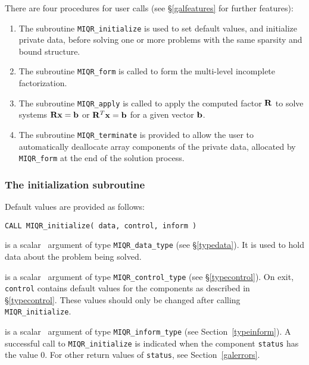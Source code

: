 \documentclass{galahad}
\newcommand{\packagename}{MIQR}
\begin{document}

\galarguments
There are four procedures for user calls
(see \S\ref{galfeatures} for further features):

\begin{enumerate}
\item The subroutine
      {\tt \packagename\_initialize}
      is used to set default values, and initialize private data,
      before solving one or more problems with the
      same sparsity and bound structure.
\item The subroutine
      {\tt \packagename\_form}
      is called to form the  multi-level incomplete factorization.
\item The subroutine
      {\tt \packagename\_apply}
      is called to apply the computed factor ${\mathbf{R}}$ to solve systems
      ${\mathbf{R}} {\mathbf{x}} = {\mathbf{b}}$ or ${\mathbf{R}}^T {\mathbf{x}} = {\mathbf{b}}$
      for a given vector ${\mathbf{b}}$.
\item The subroutine
      {\tt \packagename\_terminate}
      is provided to allow the user to automatically deallocate array
       components of the private data, allocated by
       {\tt \packagename\_form}
       at the end of the solution process.
\end{enumerate}


\subsubsection{The initialization subroutine}\label{subinit}
 Default values are provided as follows:
\vspace*{1mm}

\hspace{8mm}
{\tt CALL \packagename\_initialize( data, control, inform )}

\vspace*{-3mm}
\begin{description}

 is a scalar \intentinout\ argument of type
{\tt \packagename\_data\_type}
(see \S\ref{typedata}). It is used to hold data about the problem being
solved.

 is a scalar \intentout\ argument of type
{\tt \packagename\_control\_type}
(see \S\ref{typecontrol}).
On exit, {\tt control} contains default values for the components as
described in \S\ref{typecontrol}.
These values should only be changed after calling
{\tt \packagename\_initialize}.

 is a scalar \intentout\ argument of type
{\tt \packagename\_inform\_type}
(see Section~\ref{typeinform}). A successful call to
{\tt \packagename\_initialize}
is indicated when the  component {\tt status} has the value 0.
For other return values of {\tt status}, see Section~\ref{galerrors}.

\end{description}
\end{document}
